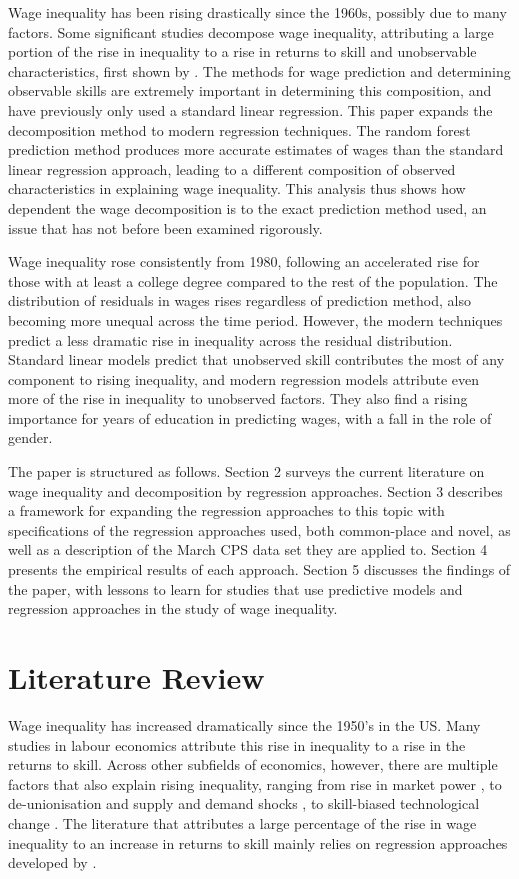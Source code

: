 \documentclass[notitlepage,12pt]{article}
\begin{document}
Wage inequality has been rising drastically since the 1960s, possibly due to many factors.  Some significant studies decompose wage inequality, attributing a large portion of the rise in inequality to a rise in returns to skill and unobservable characteristics, first shown by \cite{juhn1993wage}.  The methods for wage prediction and determining observable skills are extremely important in determining this composition, and have previously only used a standard linear regression.  This paper expands the \cite{juhn1993wage} decomposition method to modern regression techniques.  The random forest prediction method produces more accurate estimates of wages than the standard linear regression approach, leading to a different composition of observed characteristics in explaining wage inequality.  This analysis thus shows how dependent the wage decomposition is to the exact prediction method used, an issue that has not before been examined rigorously. 

Wage inequality rose consistently from 1980, following an accelerated rise for those with at least a college degree compared to the rest of the population.  The distribution of residuals in wages rises regardless of prediction method, also becoming more unequal across the time period.  However, the modern techniques predict a less dramatic rise in inequality across the residual distribution.  Standard linear models predict that unobserved skill contributes the most of any component to rising inequality, and modern regression models attribute even more of the rise in inequality to unobserved factors.  They also find a rising importance for years of education in predicting wages, with a fall in the role of gender.

The paper is structured as follows.  Section 2 surveys the current literature on wage inequality and decomposition by regression approaches.  Section 3 describes a framework for expanding the regression approaches to this topic with specifications of the regression approaches used, both common-place and novel, as well as a description of the March CPS data set they are applied to.  Section 4 presents the empirical results of each approach.  Section 5 discusses the findings of the paper, with lessons to learn for studies that use predictive models and regression approaches in the study of wage inequality.

\section{Literature Review}
Wage inequality has increased dramatically since the 1950's in the US.  Many studies in labour economics attribute this rise in inequality to a rise in the returns to skill.  Across other subfields of economics, however, there are multiple factors that also explain rising inequality, ranging from rise in market power \citep{furman2015firm}, to de-unionisation and supply and demand shocks \citep{DML95}, to skill-biased technological change \citep{acemoglu1998new,acemoglu2002technical}.  The literature that attributes a large percentage of the rise in wage inequality to an increase in returns to skill mainly relies on regression approaches developed by \cite{mincer1958investment,mincer1974schooling}.  
\end{document}
